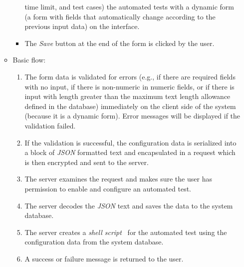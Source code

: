 \begin{enumerate}
\begin{itemize}
\begin{itemize}
                time limit, and
                test cases) the automated tests with a dynamic form (a form
                with fields that automatically change according to the previous
                input data) on the
                interface.
            \item The \emph{Save} button at the end of the form is clicked by
                the user.
        \end{itemize}
    \item Basic flow:
        \begin{enumerate}
            \item The form data is validated for errors
                (e.g., if there are required fields with no input,
                if there is non-numeric
                in numeric fields, or if there is input with length greater
                than the maximum text length allowance defined in the database)
                immediately on the client side of the system (because it is a
                dynamic form). Error messages
                will be displayed if the validation failed.
            \item If the validation is successful, the configuration data is
                serialized into a block of \emph{JSON} \cite{JSON} formatted text and
                encapsulated in a request which is then encrypted and sent to
                the server.
            \item The server examines the request and makes sure the user has
                permission to enable and configure an automated test.
            \item The server decodes the \emph{JSON} text and saves the data to
                the system database.
            \item The server creates a \emph{shell script}~\cite{shellScript}
                for the automated test using the configuration data from the
                system database.
            \item A success or failure message is returned to the user.
        \end{enumerate}
\end{itemize}


\end{enumerate}
